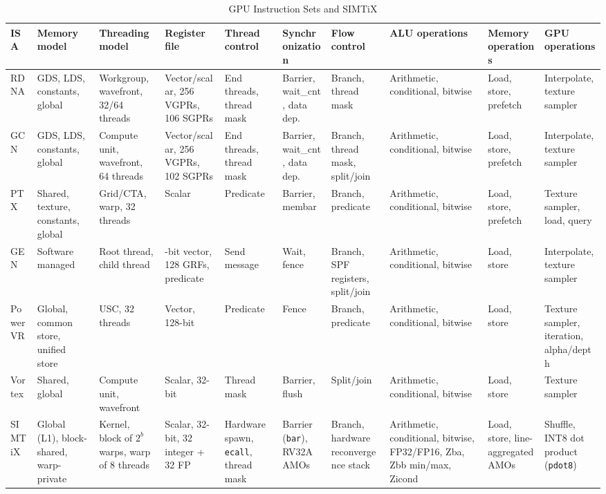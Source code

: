 \begin{table}[t]
\caption{GPU Instruction Sets and SIMTiX}
\label{tab:isa}
\centering\scriptsize
\setlength{\tabcolsep}{2.2pt}
\renewcommand{\arraystretch}{1.15}
\begin{tabular}{l*{9}{>{\raggedright\arraybackslash}p{}}}
\toprule
ISA & Memory model & Threading model & Register file & Thread control &
Synchro\-nization & Flow control & ALU operations & Memory operations & GPU operations\\
\midrule
RDNA & GDS, LDS, constants, global & Workgroup, wavefront, 32/64 threads &
Vector/scalar, 256 VGPRs, 106 SGPRs & End threads, thread mask &
Barrier, wait\_cnt, data dep. & Branch, thread mask & Arithmetic, conditional, bitwise &
Load, store, prefetch & Interpolate, texture sampler\\
GCN & GDS, LDS, constants, global & Compute unit, wavefront, 64 threads &
Vector/scalar, 256 VGPRs, 102 SGPRs & End threads, thread mask &
Barrier, wait\_cnt, data dep. & Branch, thread mask, split/join &
Arithmetic, conditional, bitwise & Load, store, prefetch & Interpolate, texture sampler\\
PTX & Shared, texture, constants, global & Grid/CTA, warp, 32 threads & Scalar &
Predicate & Barrier, membar & Branch, predicate & Arithmetic, conditional, bitwise &
Load, store, prefetch & Texture sampler, load, query\\
GEN & Software managed & Root thread, child thread &
256-bit vector, 128 GRFs, predicate & Send message & Wait, fence &
Branch, SPF registers, split/join & Arithmetic, conditional, bitwise & Load, store &
Interpolate, texture sampler\\
PowerVR & Global, common store, unified store & USC, 32 threads & Vector, 128-bit &
Predicate & Fence & Branch, predicate & Arithmetic, conditional, bitwise & Load, store &
Texture sampler, iteration, alpha/depth\\
Vortex & Shared, global & Compute unit, wavefront & Scalar, 32-bit & Thread mask &
Barrier, flush & Split/join & Arithmetic, conditional, bitwise & Load, store &
Texture sampler\\
\midrule
SIMTiX & Global (L1), block-shared, warp-private & Kernel, block of $2^b$ warps, warp
of 8 threads & Scalar, 32-bit, 32 integer + 32 FP & Hardware spawn, \texttt{ecall},
thread mask & Barrier (\texttt{bar}), RV32A AMOs & Branch, hardware reconvergence
stack & Arithmetic, conditional, bitwise, FP32/FP16, Zba, Zbb min/max, Zicond &
Load, store, line-aggregated AMOs & Shuffle, INT8 dot product (\texttt{pdot8})\\
\bottomrule
\end{tabular}

\end{table}
